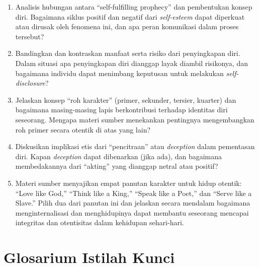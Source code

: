 \documentclass[
  letterpaper,
  DIV=11,
  numbers=noendperiod]{scrreprt}
\providecommand{\tightlist}{%
  \setlength{\itemsep}{0pt}\setlength{\parskip}{0pt}}
\begin{document}
\begin{enumerate}
\def\labelenumi{\arabic{enumi}.}
\tightlist
\item
  Analisis hubungan antara ``self-fulfilling prophecy'' dan pembentukan
  konsep diri. Bagaimana siklus positif dan negatif dari
  \emph{self-esteem} dapat diperkuat atau dirusak oleh fenomena ini, dan
  apa peran komunikasi dalam proses tersebut?
\item
  Bandingkan dan kontraskan manfaat serta risiko dari penyingkapan diri.
  Dalam situasi apa penyingkapan diri dianggap layak diambil risikonya,
  dan bagaimana individu dapat menimbang keputusan untuk melakukan
  \emph{self-disclosure}?
\item
  Jelaskan konsep ``roh karakter'' (primer, sekunder, tersier, kuarter)
  dan bagaimana masing-masing lapis berkontribusi terhadap identitas
  diri seseorang. Mengapa materi sumber menekankan pentingnya
  mengembangkan roh primer secara otentik di atas yang lain?
\item
  Diskusikan implikasi etis dari ``pencitraan'' atau \emph{deception}
  dalam pementasan diri. Kapan \emph{deception} dapat dibenarkan (jika
  ada), dan bagaimana membedakannya dari ``akting'' yang dianggap netral
  atau positif?
\item
  Materi sumber menyajikan empat panutan karakter untuk hidup otentik:
  ``Love like God,'' ``Think like a King,'' ``Speak like a Poet,'' dan
  ``Serve like a Slave.'' Pilih dua dari panutan ini dan jelaskan secara
  mendalam bagaimana menginternalisasi dan menghidupinya dapat membantu
  seseorang mencapai integritas dan otentisitas dalam kehidupan
  sehari-hari.
\end{enumerate}

\section{Glosarium Istilah Kunci}\label{glosarium-istilah-kunci-1}
\end{document}
